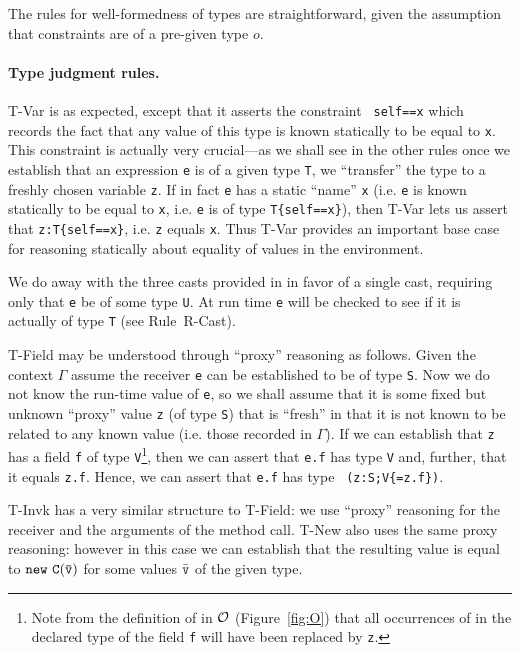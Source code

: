 The rules for well-formedness of types are straightforward, given 
the assumption that constraints are of a pre-given type $o$.

\paragraph{Type judgment rules.}
{\sc T-Var} is as expected, except that it asserts the constraint {\tt
self==x} which records the fact that any value of this type is known
statically to be equal to {\tt x}. This constraint is actually very
crucial---as we shall see in the other rules once we establish that
an expression {\tt e} is of a given type {\tt T}, we ``transfer'' the
type to a freshly chosen variable {\tt z}. If in fact {\tt e} has a
static ``name'' {\tt x} (i.e.{} {\tt e} is known statically to be
equal to {\tt x}, i.e.{} {\tt e} is of type {\tt T\{self==x\}}), then
{\sc T-Var} lets us assert that {\tt z:T\{self==x\}}, i.e.{} {\tt z}
equals {\tt x}. Thus {\sc T-Var} provides an important base case for
reasoning statically about equality of values in the environment.

We do away with the three casts provided in\FJ{} in favor of a single
cast, requiring only that {\tt e} be of some type {\tt U}. At run time
{\tt e} will be checked to see if it is actually of type {\tt T} (see
Rule~{\sc R-Cast}).

{\sc T-Field} may be understood through ``proxy'' reasoning as
follows.  Given the context $\Gamma$ assume the receiver {\tt e} can
be established to be of type {\tt S}. Now we do not know the run-time
value of {\tt e}, so we shall assume that it is some fixed but unknown
``proxy'' value {\tt z} (of type {\tt S}) that is ``fresh'' in that it
is not known to be related to any known value (i.e.{} those recorded
in $\Gamma$).  If we can establish that {\tt z} has a field {\tt f} of
type {\tt V}\footnote{Note from the definition of
\fields{} in ${\cal O}$ (Figure~\ref{fig:O}) that all occurrences of
\this{} in the declared type of the field {\tt f} will have been replaced
by {\tt z}.}, then we can assert that
{\tt e.f} has type {\tt V} and, further, that it equals {\tt z.f}.
Hence, we can assert that {\tt e.f} has type {\tt
(z:S;V\{\self=z.f\})}.

{\sc T-Invk} has a very similar structure to {\sc T-Field}: we use
``proxy'' reasoning for the receiver and the arguments of the method
call. {\sc T-New} also uses the same proxy reasoning: however in this case
we can establish that the resulting value is equal to ${\tt new\ C(\bar{\tt v})}$
for some values $\bar{\tt v}$ of the given type.

